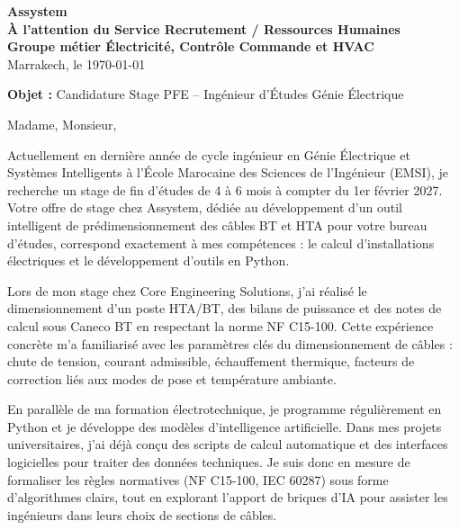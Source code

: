 \documentclass[10pt,a4paper]{altacv}
\makeatletter
\renewcommand{\makecvheader}{%
  \begingroup
    \raggedright\color{emphasis}%
    {\Huge\bfseries\MakeUppercase{\@name}\par}
    \medskip
    {\large\bfseries\color{accent}\@tagline\par}
    \medskip
    {\footnotesize\bfseries\@personalinfo\par}
  \endgroup\medskip
}
\makeatother
\begin{document}

\makecvheader

\bigskip

\begin{flushright}
  \textbf{Assystem} \\[2pt]
  {\color{emphasis}\textbf{À l'attention du Service Recrutement / Ressources Humaines}} \\
  \textbf{Groupe métier Électricité, Contrôle Commande et HVAC} \\[15pt]
  Marrakech, le \today
\end{flushright}
\bigskip

{\color{accent}\textbf{Objet :}} Candidature Stage PFE -- Ingénieur d'Études Génie Électrique
\bigskip\smallskip

Madame, Monsieur,

\vspace{0.35cm}

Actuellement en dernière année de cycle ingénieur en Génie Électrique et Systèmes Intelligents à l'École Marocaine des Sciences de l'Ingénieur (EMSI), je recherche un stage de fin d'études de 4 à 6 mois à compter du 1er février 2027. Votre offre de stage chez Assystem, dédiée au développement d'un outil intelligent de prédimensionnement des câbles BT et HTA pour votre bureau d'études, correspond exactement à mes compétences : le calcul d'installations électriques et le développement d'outils en Python.

\vspace{0.35cm}

Lors de mon stage chez Core Engineering Solutions, j'ai réalisé le dimensionnement d'un poste HTA/BT, des bilans de puissance et des notes de calcul sous Caneco BT en respectant la norme NF C15-100. Cette expérience concrète m'a familiarisé avec les paramètres clés du dimensionnement de câbles : chute de tension, courant admissible, échauffement thermique, facteurs de correction liés aux modes de pose et température ambiante.

\vspace{0.35cm}

En parallèle de ma formation électrotechnique, je programme régulièrement en Python et je développe des modèles d'intelligence artificielle. Dans mes projets universitaires, j'ai déjà conçu des scripts de calcul automatique et des interfaces logicielles pour traiter des données techniques. Je suis donc en mesure de formaliser les règles normatives (NF C15-100, IEC 60287) sous forme d'algorithmes clairs, tout en explorant l'apport de briques d'IA pour assister les ingénieurs dans leurs choix de sections de câbles.
\end{document}
